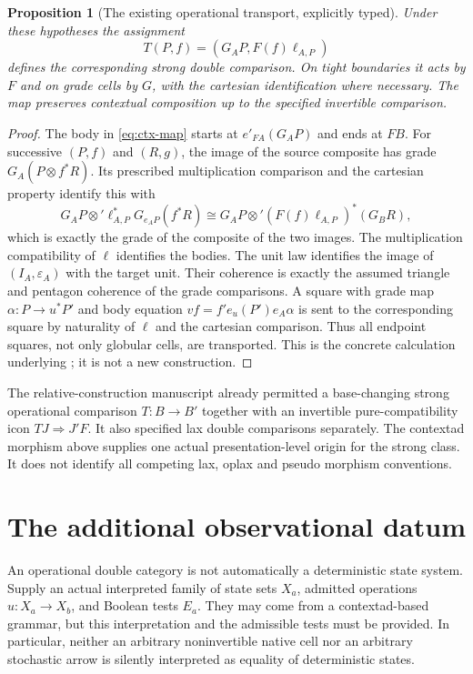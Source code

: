 \documentclass[11pt]{article}
\newtheorem{proposition}[theorem]{Proposition}
\theoremstyle{definition}\newtheorem{definition}[theorem]{Definition}
\theoremstyle{remark}\newtheorem{remark}[theorem]{Remark}
\begin{document}
\begin{proposition}[The existing operational transport, explicitly typed]
Under these hypotheses the assignment
\begin{equation}\label{eq:ctx-map}
 T(P,f)=(G_AP,F(f)\ell_{A,P})
\end{equation}
defines the corresponding strong double comparison. On tight boundaries it
acts by $F$ and on grade cells by $G$, with the cartesian identification where
necessary. The map preserves contextual composition up to the specified
invertible comparison.
\end{proposition}
\begin{proof}
The body in \eqref{eq:ctx-map} starts at $e'_{FA}(G_AP)$ and ends at $FB$.
For successive $(P,f)$ and $(R,g)$, the image of the source composite has grade
$G_A(P\otimes f^*R)$. Its prescribed multiplication comparison and the
cartesian property identify this with
\[
 G_AP\otimes'\ell_{A,P}^{*}G_{e_AP}(f^*R)
 \cong G_AP\otimes'(F(f)\ell_{A,P})^*(G_BR),
\]
which is exactly the grade of the composite of the two images. The
multiplication compatibility of $\ell$ identifies the bodies. The unit law
identifies the image of $(I_A,\varepsilon_A)$ with the target unit. Their
coherence is exactly the assumed triangle and pentagon coherence of the grade
comparisons. A square with grade map $\alpha:P\to u^*P'$ and body equation
$v f=f'e_u(P')e_A\alpha$ is sent to the corresponding square by naturality
of $\ell$ and the cartesian comparison. Thus all endpoint squares, not only
globular cells, are transported. This is the concrete calculation underlying
\cite[equations (5.6.20)--(5.6.21)]{CM2}; it is not a new construction.
\end{proof}

The relative-construction manuscript \cite{Relative} already permitted a
base-changing strong operational comparison $T:B\to B'$ together with an
invertible pure-compatibility icon $TJ\Rightarrow J'F$. It also specified
lax double comparisons separately. The contextad morphism above supplies one
actual presentation-level origin for the strong class. It does not identify
all competing lax, oplax and pseudo morphism conventions.

\section{The additional observational datum}
An operational double category is not automatically a deterministic state
system. Supply an actual interpreted family of state sets $X_a$, admitted
operations $u:X_a\to X_b$, and Boolean tests $E_a$. They may come from a
contextad-based grammar, but this interpretation and the admissible tests
must be provided. In particular, neither an arbitrary noninvertible native
cell nor an arbitrary stochastic arrow is silently interpreted as equality of
deterministic states.
\end{document}
